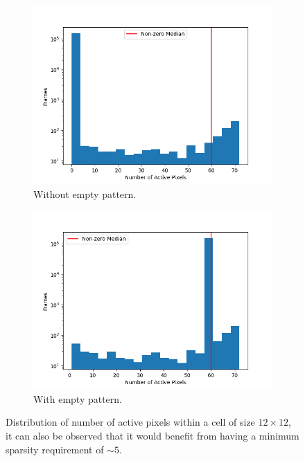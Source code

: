 \begin{figure}[H]
    \centering
    \begin{subfigure}[t]{0.5\textwidth}
        \centering
        \includegraphics[width=\textwidth]{resources/methodology/active_pixels_dist.png}
        \caption{Without empty pattern.}
    \end{subfigure}%
    \begin{subfigure}[t]{0.5\textwidth}
        \centering
        \includegraphics[width=\textwidth]{resources/methodology/active_pixels_dist2.png}
        \caption{With empty pattern.}
    \end{subfigure}
    \caption{Distribution of number of active pixels within a cell of size $12\times 12$, it can also be observed that it would benefit from having a minimum sparsity requirement of $\sim 5$.}
    \label{fig:num_active_pixels_dist}
\end{figure}


